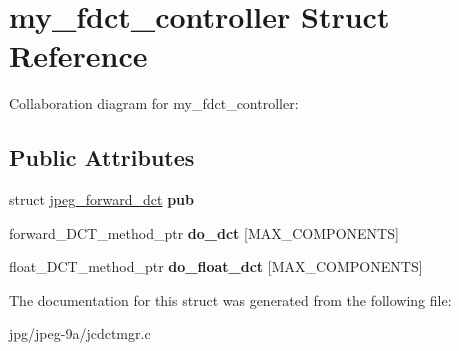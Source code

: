 \hypertarget{structmy__fdct__controller}{\section{my\+\_\+fdct\+\_\+controller Struct Reference}
\label{structmy__fdct__controller}
}


Collaboration diagram for my\+\_\+fdct\+\_\+controller\+:
\subsection*{Public Attributes}
\begin{DoxyCompactItemize}
\item 
\hypertarget{structmy__fdct__controller_a233a1343c6fc838dcad3d3dce3a658a0}{struct \hyperlink{structjpeg__forward__dct}{jpeg\+\_\+forward\+\_\+dct} {\bfseries pub}}\label{structmy__fdct__controller_a233a1343c6fc838dcad3d3dce3a658a0}

\item 
\hypertarget{structmy__fdct__controller_a4708c82c14bc7a348520824d38f66f06}{forward\+\_\+\+D\+C\+T\+\_\+method\+\_\+ptr {\bfseries do\+\_\+dct} \mbox{[}M\+A\+X\+\_\+\+C\+O\+M\+P\+O\+N\+E\+N\+T\+S\mbox{]}}\label{structmy__fdct__controller_a4708c82c14bc7a348520824d38f66f06}

\item 
\hypertarget{structmy__fdct__controller_acaf7fa6e7d2647b35436654eb02d9bb3}{float\+\_\+\+D\+C\+T\+\_\+method\+\_\+ptr {\bfseries do\+\_\+float\+\_\+dct} \mbox{[}M\+A\+X\+\_\+\+C\+O\+M\+P\+O\+N\+E\+N\+T\+S\mbox{]}}\label{structmy__fdct__controller_acaf7fa6e7d2647b35436654eb02d9bb3}

\end{DoxyCompactItemize}


The documentation for this struct was generated from the following file\+:\begin{DoxyCompactItemize}
\item 
jpg/jpeg-\/9a/jcdctmgr.\+c\end{DoxyCompactItemize}
